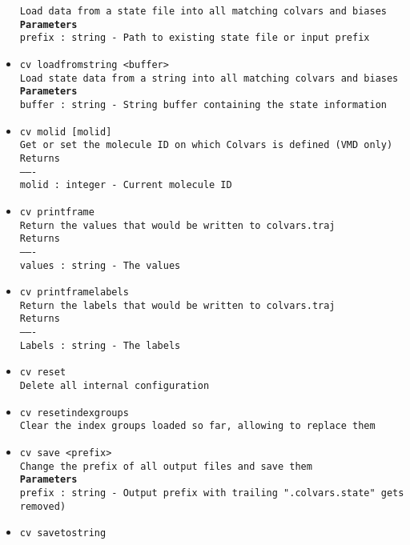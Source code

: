 \begin{itemize}
\texttt{Load data from a state file into all matching colvars and biases}
\\
\texttt{\textbf{Parameters}}
\\
\texttt{prefix : string - Path to existing state file or input prefix}
\item \texttt{cv loadfromstring <buffer>}
\\
\texttt{Load state data from a string into all matching colvars and biases}
\\
\texttt{\textbf{Parameters}}
\\
\texttt{buffer : string - String buffer containing the state information}
\item \texttt{cv molid [molid]}
\\
\texttt{Get or set the molecule ID on which Colvars is defined (VMD only)}
\\
\texttt{Returns}
\\
\texttt{-------}
\\
\texttt{molid : integer - Current molecule ID}
\item \texttt{cv printframe}
\\
\texttt{Return the values that would be written to colvars.traj}
\\
\texttt{Returns}
\\
\texttt{-------}
\\
\texttt{values : string - The values}
\item \texttt{cv printframelabels}
\\
\texttt{Return the labels that would be written to colvars.traj}
\\
\texttt{Returns}
\\
\texttt{-------}
\\
\texttt{Labels : string - The labels}
\item \texttt{cv reset}
\\
\texttt{Delete all internal configuration}
\item \texttt{cv resetindexgroups}
\\
\texttt{Clear the index groups loaded so far, allowing to replace them}
\item \texttt{cv save <prefix>}
\\
\texttt{Change the prefix of all output files and save them}
\\
\texttt{\textbf{Parameters}}
\\
\texttt{prefix : string - Output prefix with trailing ".colvars.state" gets removed)}
\item \texttt{cv savetostring}

\end{itemize}
